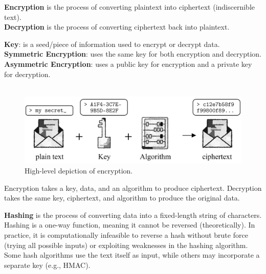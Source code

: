 \newpage 

\begin{Def}[Encryption]

    \textbf{Encryption} is the process of converting plaintext into ciphertext (indiscernible text).\\
    \textbf{Decryption} is the process of converting ciphertext back into plaintext.

\end{Def}
\begin{Def}
    
    \textbf{Key}: is a seed/piece of information used to encrypt or decrypt data.\\
    \textbf{Symmetric Encryption}: uses the same key for both encryption and decryption.\\
    \textbf{Asymmetric Encryption}: uses a public key for encryption and a private key for decryption.\\
    ${}$ \hfill \cite{adetunji_symmetric_asymmetric_encryption}
\end{Def}

\vspace{-1em}
\begin{figure}[h!]
    \centering
    \includegraphics[width=1\textwidth]{Sections/sec/encrypt.png}
    \caption{High-level depiction of encryption.}
    \label{fig:encryption}
\end{figure}

\noindent
Encryption takes a key, data, and an algorithm to produce ciphertext.
Decryption takes the same key, ciphertext, and algorithm to produce the original data.

\vspace{1em}
\begin{Def}[Hashing]
    \textbf{Hashing} is the process of converting data into a fixed-length string of characters.
    Hashing is a one-way function, meaning it cannot be reversed (theoretically). In practice, 
    it is computationally infeasible to reverse a hash without brute force (trying all possible inputs) 
    or exploiting weaknesses in the hashing algorithm. Some hash algorithms use the text itself 
    as input, while others may incorporate a separate key (e.g., HMAC). \hfill \cite{codecademy_hashing}
\end{Def}


